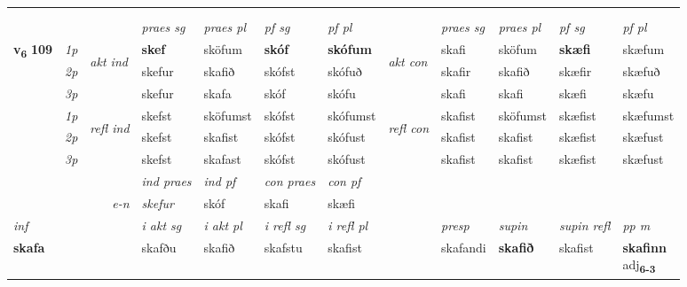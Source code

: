 \begin{longtable}[l]{X>{\footnotesize\itshape}llXXXXlXXXX}
\midrule
   & \\*
  & \\
   \midrule
 & &   & \textit{praes sg}  & \textit{praes pl}    & \textit{ pf sg} & \textit{pf pl} & & \textit{praes sg}  & \textit{praes pl}    & \textit{pf sg} & \textit{pf pl }  \\ \cmidrule{4-7} \cmidrule{9-12}
 \multirow{2}{*}{{{\textbf{v{\textsubscript{6}}} \Large{\textbf{109}}}}}  & 1p & \multirow{3}{*}{\begin{turn}{90}\textit{akt ind}\end{turn}} & \textbf{skef} & sköfum & \textbf{skóf} & \textbf{skófum} & \multirow{3}{*}{\begin{turn}{90}\textit{akt con}\end{turn}} &skafi & sköfum & \textbf{skæfi} & skæfum\\*
 & 2p &  &  skefur  & skafið & skófst & skófuð & & skafir & skafið & skæfir & skæfuð \\*
 & 3p &  & skefur & skafa & skóf & skófu & & skafi & skafi& skæfi & skæfu \\*
\cmidrule{4-7} \cmidrule{9-12}
 & 1p & \multirow{3}{*}{\begin{turn}{90}\textit{refl ind}\end{turn}}  & skefst & sköfumst & skófst & skófumst & \multirow{3}{*}{\begin{turn}{90}\textit{refl con}\end{turn}}  &skafist & sköfumst & skæfist & skæfumst \\*
 & 2p &  & skefst & skafist & skófst & skófust & &skafist & skafist & skæfist & skæfust \\*
 & 3p  & & skefst & skafast & skófst & skófust & & skafist & skafist& skæfist & skæfust \\*
\cmidrule{4-7} \cmidrule{9-12}

   && &  \textit{ind praes} & \textit{ind pf} & \textit{con praes} & \textit{con pf} \\*
\multicolumn{3}{r}{\textit{e-n}} & skefur & skóf & skafi & skæfi \\*

\cmidrule{4-7}
   {\textit{inf}} & &  & \textit{i akt sg} & \textit{i akt pl} & \textit{i refl sg} & \textit{i refl pl} && \textit{presp} & \textit{supin} & \textit{supin refl} & \textit{pp m} \\*
  {\textbf{skafa}} & && skafðu  & skafið & skafstu & skafist && skafandi &  \textbf{skafið} & skafist & \specialcell{\textbf{skafinn} \\ adj\textbf{\textsubscript{6-3}}} \\*


\end{longtable}
